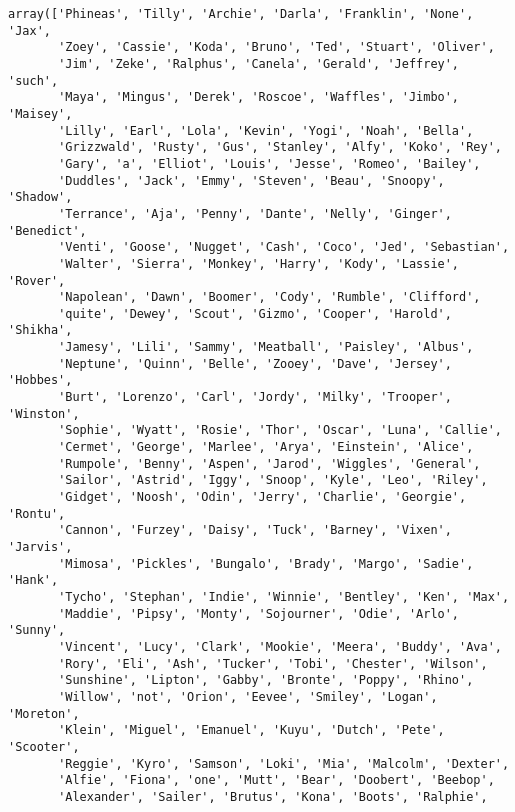 \documentclass[11pt]{article}
\makeatletter
\newcommand{\boxspacing}{\kern\kvtcb@left@rule\kern\kvtcb@boxsep}
\newcommand{\prompt}[4]{
        {\ttfamily\llap{{\color{#2}[#3]:\hspace{3pt}#4}}\vspace{-\baselineskip}}
    }
\makeatother
\begin{document}
            \begin{tcolorbox}[breakable, size=fbox, boxrule=.5pt, pad at break*=1mm, opacityfill=0]
\prompt{Out}{outcolor}{40}{\boxspacing}
\begin{Verbatim}[commandchars=\\\{\}]
array(['Phineas', 'Tilly', 'Archie', 'Darla', 'Franklin', 'None', 'Jax',
       'Zoey', 'Cassie', 'Koda', 'Bruno', 'Ted', 'Stuart', 'Oliver',
       'Jim', 'Zeke', 'Ralphus', 'Canela', 'Gerald', 'Jeffrey', 'such',
       'Maya', 'Mingus', 'Derek', 'Roscoe', 'Waffles', 'Jimbo', 'Maisey',
       'Lilly', 'Earl', 'Lola', 'Kevin', 'Yogi', 'Noah', 'Bella',
       'Grizzwald', 'Rusty', 'Gus', 'Stanley', 'Alfy', 'Koko', 'Rey',
       'Gary', 'a', 'Elliot', 'Louis', 'Jesse', 'Romeo', 'Bailey',
       'Duddles', 'Jack', 'Emmy', 'Steven', 'Beau', 'Snoopy', 'Shadow',
       'Terrance', 'Aja', 'Penny', 'Dante', 'Nelly', 'Ginger', 'Benedict',
       'Venti', 'Goose', 'Nugget', 'Cash', 'Coco', 'Jed', 'Sebastian',
       'Walter', 'Sierra', 'Monkey', 'Harry', 'Kody', 'Lassie', 'Rover',
       'Napolean', 'Dawn', 'Boomer', 'Cody', 'Rumble', 'Clifford',
       'quite', 'Dewey', 'Scout', 'Gizmo', 'Cooper', 'Harold', 'Shikha',
       'Jamesy', 'Lili', 'Sammy', 'Meatball', 'Paisley', 'Albus',
       'Neptune', 'Quinn', 'Belle', 'Zooey', 'Dave', 'Jersey', 'Hobbes',
       'Burt', 'Lorenzo', 'Carl', 'Jordy', 'Milky', 'Trooper', 'Winston',
       'Sophie', 'Wyatt', 'Rosie', 'Thor', 'Oscar', 'Luna', 'Callie',
       'Cermet', 'George', 'Marlee', 'Arya', 'Einstein', 'Alice',
       'Rumpole', 'Benny', 'Aspen', 'Jarod', 'Wiggles', 'General',
       'Sailor', 'Astrid', 'Iggy', 'Snoop', 'Kyle', 'Leo', 'Riley',
       'Gidget', 'Noosh', 'Odin', 'Jerry', 'Charlie', 'Georgie', 'Rontu',
       'Cannon', 'Furzey', 'Daisy', 'Tuck', 'Barney', 'Vixen', 'Jarvis',
       'Mimosa', 'Pickles', 'Bungalo', 'Brady', 'Margo', 'Sadie', 'Hank',
       'Tycho', 'Stephan', 'Indie', 'Winnie', 'Bentley', 'Ken', 'Max',
       'Maddie', 'Pipsy', 'Monty', 'Sojourner', 'Odie', 'Arlo', 'Sunny',
       'Vincent', 'Lucy', 'Clark', 'Mookie', 'Meera', 'Buddy', 'Ava',
       'Rory', 'Eli', 'Ash', 'Tucker', 'Tobi', 'Chester', 'Wilson',
       'Sunshine', 'Lipton', 'Gabby', 'Bronte', 'Poppy', 'Rhino',
       'Willow', 'not', 'Orion', 'Eevee', 'Smiley', 'Logan', 'Moreton',
       'Klein', 'Miguel', 'Emanuel', 'Kuyu', 'Dutch', 'Pete', 'Scooter',
       'Reggie', 'Kyro', 'Samson', 'Loki', 'Mia', 'Malcolm', 'Dexter',
       'Alfie', 'Fiona', 'one', 'Mutt', 'Bear', 'Doobert', 'Beebop',
       'Alexander', 'Sailer', 'Brutus', 'Kona', 'Boots', 'Ralphie',

\end{Verbatim}
\end{tcolorbox}
\end{document}
